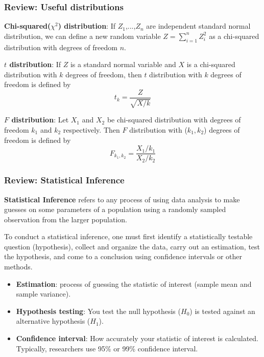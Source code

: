 \documentclass[aspectratio=169]{beamer}
\newenvironment{wideitemize}{\itemize\addtolength{\itemsep}{10pt}}{\enditemize}
\begin{document}
\begin{frame}
\frametitle{Review: Useful distributions}
\begin{wideitemize}
\item \textbf{Chi-squared($\chi^2$) distribution}: If $Z_1$,...,$Z_n$ are independent standard normal distribution, we can define a new random variable $Z=\sum_{i=1}^n Z_i^2$ as a chi-squared distribution with degrees of freedom $n$.  
\item \textbf{$t$ distribution}: If $Z$ is a standard normal variable and $X$ is a chi-squared distribution with $k$ degrees of freedom, then $t$ distribution with $k$ degrees of freedom is defined by
\[
t_k=\frac{Z}{\sqrt{X/k}}
\]
\item \textbf{$F$ distribution}: Let $X_1$ and $X_2$ be chi-squared distribution with degrees of freedom $k_1$ and $k_2$ respectively. Then $F$ distribution with ($k_1,k_2$) degrees of freedom is defined by
\[
F_{k_1,k_2}=\frac{X_1/k_1}{X_2/k_2}
\]

\end{wideitemize}
\end{frame}

\begin{frame}
\frametitle{Review: Statistical Inference}
\begin{wideitemize}
\item\textbf{Statistical Inference} refers to any process of using data analysis to make guesses on some parameters of a population using a randomly sampled observation from the larger population. 
\item To conduct a statistical inference, one must first identify a statistically testable question (hypothesis), collect and organize the data, carry out an estimation, test the hypothesis, and come to a conclusion using confidence intervals or other methods.
\begin{itemize}
\item \textbf{Estimation}: process of guessing the statistic of interest (sample mean and sample variance). 
\item \textbf{Hypothesis testing}: You test the null hypothesis ($H_0$) is tested against an alternative hypothesis ($H_1$).  
\item \textbf{Confidence interval}: How accurately your statistic of interest is calculated. Typically, researchers use 95\% or 99\% confidence interval.
\end{itemize}
\end{wideitemize}
\end{frame}
\end{document}
